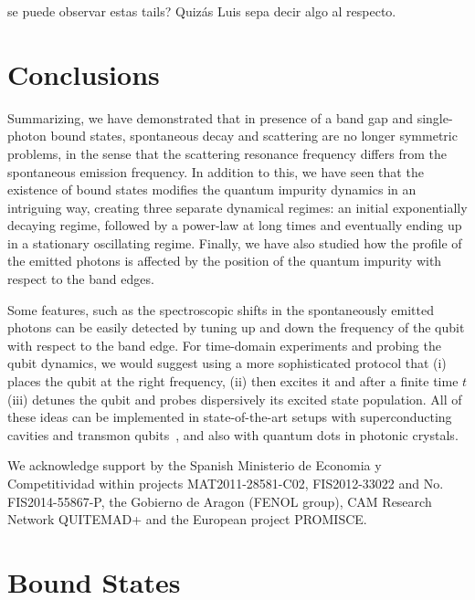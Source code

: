 \documentclass[aps,pra,twocolumn,floatfix,superscriptaddress]{revtex4-1}%
\begin{document}
{\color{red} se puede observar estas tails?} {\color{blue}Quiz\'as Luis sepa decir algo al respecto.}


\section{Conclusions}\label{sec:conclusions}

Summarizing, we have demonstrated that in presence of a band gap and single-photon bound states, spontaneous decay and scattering are no longer symmetric problems, in the sense that the scattering resonance frequency differs from the spontaneous emission frequency. In addition to this, we have seen that the existence of bound states modifies the quantum impurity dynamics in an intriguing way, creating three separate dynamical regimes: an initial exponentially decaying regime, followed by a power-law at long times and eventually ending up in a stationary oscillating regime. Finally, we have also studied how the profile of the emitted photons is affected by the position of the quantum impurity with respect to the band edges.

Some features, such as the spectroscopic shifts in the spontaneously emitted photons can be easily detected by tuning up and down the frequency of the qubit with respect to the band edge. For time-domain experiments and probing the qubit dynamics, we would suggest using a more sophisticated protocol that (i) places the qubit at the right frequency, (ii) then excites it and after a finite time $t$ (iii) detunes the qubit and probes dispersively its excited state population. All of these ideas can be implemented in state-of-the-art setups with superconducting cavities and transmon qubits\ \cite{liu2016}, and also with quantum dots in photonic crystals.


\begin{acknowledgements}
We acknowledge 
support by the Spanish Ministerio de Economia y Competitividad within projects MAT2011-28581-C02, FIS2012-33022 and No. FIS2014-55867-P, the Gobierno
de Aragon (FENOL group), CAM Research Network QUITEMAD+
and the European project PROMISCE.
\end{acknowledgements}

\appendix

\section{Bound States}\label{app:eigen}

\end{document}
